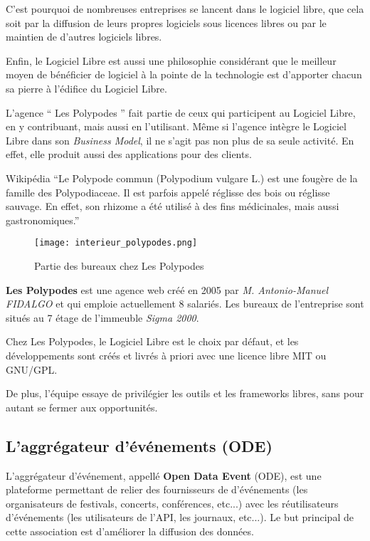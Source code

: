 C'est pourquoi de nombreuses entreprises se lancent dans le logiciel libre, que cela soit par la diffusion de leurs propres logiciels sous licences libres ou par le maintien de d'autres logiciels libres.

Enfin, le Logiciel Libre est aussi une philosophie considérant que le meilleur moyen de bénéficier de logiciel à la pointe de la technologie est d'apporter chacun sa pierre à l'édifice du Logiciel Libre.

L'agence `` Les Polypodes '' fait partie de ceux qui participent au Logiciel Libre, en y contribuant, mais aussi en l'utilisant. Même si l'agence intègre le Logiciel Libre dans son \textit{Business Model}, il ne s'agit pas non plus de sa seule activité. En effet, elle produit aussi des applications pour des clients.

\newpage

\begin{aquote}{Wikipédia}
``Le Polypode commun (Polypodium vulgare L.) est une fougère de la famille des Polypodiaceae. Il est parfois appelé réglisse des bois ou réglisse sauvage. En effet, son rhizome a été utilisé à des fins médicinales, mais aussi gastronomiques.''
\end{aquote}

\begin{figure}[h]
\begin{center}
\texttt{[image: interieur\_polypodes.png]}
\end{center}
\caption{Partie des bureaux chez Les Polypodes}
\end{figure}

\textbf{Les Polypodes} est une agence web créé en 2005 par \textit{M. Antonio-Manuel FIDALGO} et qui emploie actuellement 8 salariés. Les bureaux de l'entreprise sont situés au 7 étage de l'immeuble \textit{Sigma 2000}.

Chez Les Polypodes, le Logiciel Libre est le choix par défaut, et les développements sont créés et livrés à priori avec une licence libre MIT ou GNU/GPL.

De plus, l'équipe essaye de privilégier les outils et les frameworks libres, sans pour autant se fermer aux opportunités.

\subsection{L'aggrégateur d'événements (ODE)}

L'aggrégateur d'événement, appellé \textbf{Open Data Event} (ODE), est une plateforme permettant de relier des fournisseurs de d'événements  (les organisateurs de festivals, concerts, conférences, etc...) avec les réutilisateurs d’événements (les utilisateurs de l’API, les journaux, etc...). Le but principal de cette association est d'améliorer la diffusion des données.

